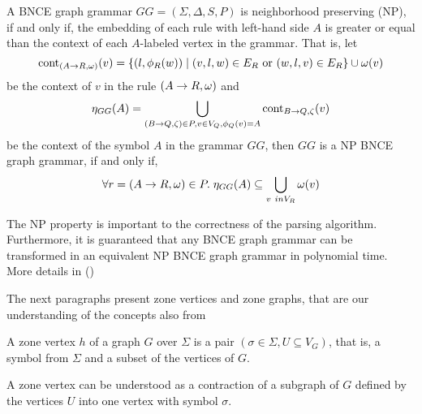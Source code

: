 \documentclass[]{report}
\begin{document}
\begin{definition}
	\label{def:np}
	A BNCE graph grammar $GG = (\Sigma, \Delta, S, P)$ is neighborhood preserving (NP), if and only if, the embedding of each rule with left-hand side $A$ is greater or equal than the context of each $A$-labeled vertex in the grammar. That is, let 
	\[\operatorname{cont}_{(A \to R,\omega)}(v) =\{(l,\phi_{R}(w)) \; | \; (v,l,w) \in E_R \text { or } (w,l,v) \in E_R \} \cup \omega(v) \]
	be the context of $v$ in the rule $(A \to R,\omega)$ and
	\[\eta_{GG}(A) = \bigcup_{(B \to Q,\zeta) \in P, v \in V_Q, \phi_Q(v) = A} \operatorname{cont}_{B \to Q,\zeta}(v) \] 
	be the context of the symbol $A$ in the grammar $GG$, then $GG$ is a NP BNCE graph grammar, if and only if,
	\[ \forall r = (A \to R,\omega) \in P . \; \eta_{GG}(A) \subseteq \bigcup_{v \ in V_R} \omega(v) \]
\end{definition}

The NP property is important to the correctness of the parsing algorithm. Furthermore, it is guaranteed that any BNCE graph grammar can be transformed in an equivalent NP BNCE graph grammar in polynomial time. More details in () %

The next paragraphs present zone vertices and zone graphs, that are our understanding of the concepts also from %

\begin{definition}
	A zone vertex $h$ of a graph $G$ over $\Sigma$ is a pair $(\sigma \in \Sigma, U \subseteq V_G)$, that is, a symbol from $\Sigma$ and a subset of the vertices of $G$.
	
	A zone vertex can be understood as a contraction of a subgraph of $G$ defined by the vertices $U$ into one vertex with symbol $\sigma$.
\end{definition}
\end{document}
